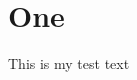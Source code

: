 \documentclass[a4paper,oneside,11pt]{article}%
\begin{document}
\tableofcontents

\section{One}

This is my test text~\citeauthor{Dung:2012}

\printbibliography%
\end{document}
